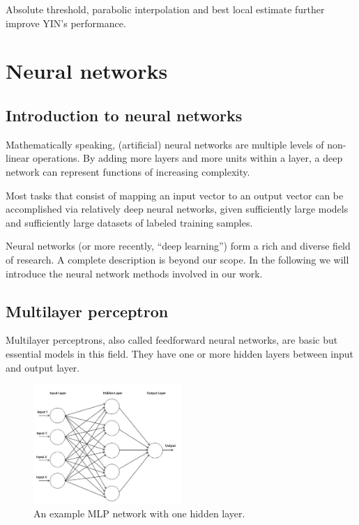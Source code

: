 \documentclass[11pt,a4paper]{report}
\begin{document}
Absolute threshold, parabolic interpolation and best local estimate further improve YIN's performance.

\newpage

\section{Neural networks}

\subsection{Introduction to neural networks}

Mathematically speaking, (artificial) neural networks are multiple levels of non-linear operations.
By adding more layers and more units within a layer, a deep network can represent functions of increasing complexity.

Most tasks that consist of mapping an input vector to an output vector can be accomplished via relatively deep neural networks, given sufficiently large models and sufficiently large datasets of labeled training samples.

Neural networks (or more recently, \enquote{deep learning}) form a rich and diverse field of research.
A complete description is beyond our scope.
In the following we will introduce the neural network methods involved in our work.

\subsection{Multilayer perceptron}

Multilayer perceptrons, also called feedforward neural networks, are basic but essential models in this field.
They have one or more hidden layers between input and output layer.

\begin{figure}[htbp]
  \centering
  \includegraphics[width=0.5\textwidth]{mlp-example.jpg}
  \caption{An example MLP network with one hidden layer.} \label{fig:mlp-example}
\end{figure}
\end{document}
